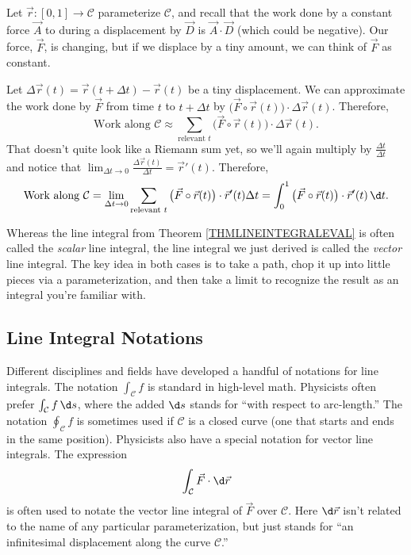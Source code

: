 Let $\vec r:[0,1]\to\mathcal C$ parameterize $\mathcal C$, and recall that 
the work done by a constant force $\vec A$ to during a displacement by $\vec D$
is $\vec A\cdot \vec D$ (which could be negative).  Our force, $\vec F$,
is changing, but if we displace by a tiny amount, we can think of $\vec F$
as constant.

Let $\Delta \vec r(t) = \vec r(t+\Delta t) - \vec r(t)$ be a tiny displacement.
We can approximate the work done by $\vec F$ from time $t$ to $t+\Delta t$ by
$\big(\vec F\circ \vec r(t)\big) \cdot \Delta\vec r(t)$.  Therefore,
\[
	\text{Work along }\mathcal C \approx \sum_{\text{relevant }t}\big(\vec F\circ \vec r(t)\big) \cdot \Delta\vec r(t).
\]
That doesn't quite look like a Riemann sum yet, so we'll again multiply by $\frac{\Delta t}{\Delta t}$
and notice that $\lim_{\Delta t\to 0}\frac{\Delta\vec r(t)}{\Delta t} = \vec r'(t)$.
Therefore,
\[
	\text{Work along }\mathcal C  =
	\lim_{\Delta t\to 0}\sum_{\text{relevant }t}\big(\vec F\circ \vec r(t)\big) \cdot \vec r'(t)\Delta t
	=\int_0^1 \big(\vec F\circ \vec r(t)\big)\cdot \vec r'(t)\,\d t.
\]

Whereas the line integral from Theorem \ref{THMLINEINTEGRALEVAL} is often
called the \emph{scalar} line integral, the line integral we just derived
is called the \emph{vector} line integral.  The key idea in both cases
is to take a path, chop it up into little pieces via a parameterization, and then
take a limit to recognize the result as an integral you're familiar with.

\subsection{Line Integral Notations}

Different disciplines and fields have developed a handful of notations for line
integrals.  The notation $\int_{\mathcal C} f$ is standard in high-level math.
Physicists often prefer $\int_{\mathcal C}f\,\d s$, where the added $\d s$ stands
for ``with respect to arc-length.''  The notation $\oint_{\mathcal C} f$ is
sometimes used if $\mathcal C$ is a closed curve (one that starts and ends in the same
position).  Physicists also have a special notation for vector line integrals.
The expression
\[
	\int_{\mathcal C} \vec F\cdot \d\vec r
\]
is often used to notate the vector line integral of $\vec F$ over $\mathcal C$.
Here $\d \vec r$ isn't related to the name of any particular parameterization,
but just stands for ``an infinitesimal displacement along the curve $\mathcal C$.''


